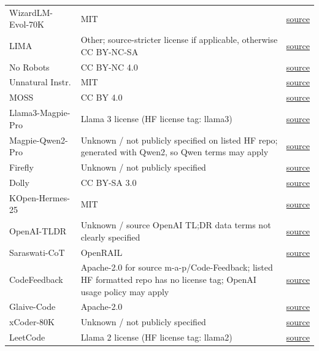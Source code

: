 \begin{longtable}{@{}>{\raggedright\arraybackslash}p{}>{\raggedright\arraybackslash}p{}>{\raggedright\arraybackslash}p{}@{}}
WizardLM-Evol-70K & MIT & \href{https://huggingface.co/datasets/WizardLMTeam/WizardLM_evol_instruct_70k}{source} \\
LIMA & Other; source-stricter license if applicable, otherwise CC BY-NC-SA & \href{https://huggingface.co/datasets/GAIR/lima}{source} \\
No Robots & CC BY-NC 4.0 & \href{https://huggingface.co/datasets/HuggingFaceH4/no_robots}{source} \\
Unnatural Instr. & MIT & \href{https://github.com/orhonovich/unnatural-instructions/raw/main/data/core_data.zip}{source} \\
MOSS & CC BY 4.0 & \href{https://huggingface.co/datasets/fnlp/moss-002-sft-data}{source} \\
Llama3-Magpie-Pro & Llama 3 license (HF license tag: llama3) & \href{https://huggingface.co/datasets/Magpie-Align/Llama-3-Magpie-Pro-1M-v0.1}{source} \\
Magpie-Qwen2-Pro & Unknown / not publicly specified on listed HF repo; generated with Qwen2, so Qwen terms may apply & \href{https://huggingface.co/datasets/Magpie-Align/Magpie-Qwen2-Pro-1M-v0.1}{source} \\
Firefly & Unknown / not publicly specified & \href{https://huggingface.co/datasets/YeungNLP/firefly-train-1.1M}{source} \\
Dolly & CC BY-SA 3.0 & \href{https://huggingface.co/datasets/databricks/databricks-dolly-15k}{source} \\
KOpen-Hermes-25 & MIT & \href{https://huggingface.co/datasets/MarkrAI/KOpen-HQ-Hermes-2.5-60K}{source} \\
OpenAI-TLDR & Unknown / source OpenAI TL;DR data terms not clearly specified & \href{https://huggingface.co/datasets/CarperAI/openai_summarize_tldr}{source} \\
Saraswati-CoT & OpenRAIL & \href{https://huggingface.co/datasets/knowrohit07/know-saraswati-cot}{source} \\
CodeFeedback & Apache-2.0 for source m-a-p/Code-Feedback; listed HF formatted repo has no license tag; OpenAI usage policy may apply & \href{https://huggingface.co/datasets/HuggingFaceH4/Code-Feedback}{source} \\
Glaive-Code & Apache-2.0 & \href{https://huggingface.co/datasets/glaiveai/glaive-code-assistant}{source} \\
xCoder-80K & Unknown / not publicly specified & \href{https://huggingface.co/datasets/banksy235/XCoder-80K}{source} \\
LeetCode & Llama 2 license (HF license tag: llama2) & \href{https://huggingface.co/datasets/RayBernard/leetcode}{source} \\

\end{longtable}
